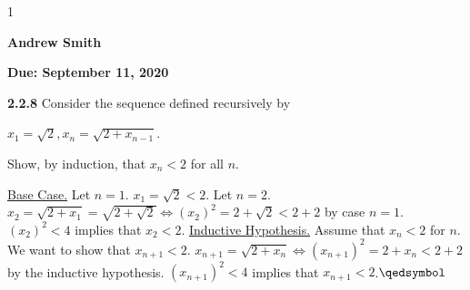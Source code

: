 \documentclass[12pt]{article}
\newcommand{\duedate}{September 11, 2020}
\newcommand{\yourname}{Andrew Smith}
\def\printsolutions{1}
\begin{document}
\if\printsolutions1
\begin{center}
\textbf{\Large \yourname}
\end{center}
\else
\begin{center}
\textbf{\Large Due: \duedate}
\end{center}
\fi


\begin{problem}\textbf{2.2.8}
Consider the sequence defined recursively by
\begin{center}
    $x_1=\sqrt{2},x_n=\sqrt{2+x_{n-1}}$.
\end{center}
Show, by induction, that $x_n<2$ for all $n$.
\end{problem}
\begin{solution}\newline
\underline{Base Case.}\newline
Let $n=1$. $x_1=\sqrt{2}<2$.\newline
Let $n=2$. $x_2=\sqrt{2+x_1}=\sqrt{2+\sqrt{2}}\iff (x_2)^2=2+\sqrt{2}<2+2$ by case $n=1$.\newline
$(x_2)^2<4$ implies that $x_2<2$.\newline
\underline{Inductive Hypothesis.}\newline
Assume that $x_n<2$ for $n$.\newline
We want to show that $x_{n+1}<2$.\newline
$x_{n+1}=\sqrt{2+x_n}\iff (x_{n+1})^2=2+x_n<2+2$ by the inductive hypothesis.\newline
$(x_{n+1})^2<4$ implies that $x_{n+1}<2$.\flushright$\qedsymbol$
\end{solution}
\end{document}
